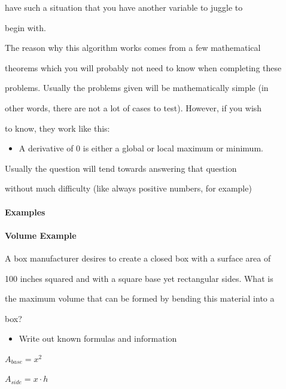     have such a situation that you have another variable to juggle to

    begin with.



The reason why this algorithm works comes from a few mathematical

theorems which you will probably not need to know when completing these

problems. Usually the problems given will be mathematically simple (in

other words, there are not a lot of cases to test). However, if you wish

to know, they work like this:



\begin{itemize}
    \item A derivative of 0 is either a global or local maximum or minimum.
\end{itemize}
    Usually the question will tend towards answering that question

    without much difficulty (like always positive numbers, for example)



\paragraph{Examples}



\paragraph{Volume Example}



A box manufacturer desires to create a closed box with a surface area of

100 inches squared and with a square base yet rectangular sides. What is

the maximum volume that can be formed by bending this material into a

box?



\begin{itemize}
    \item Write out known formulas and information
\end{itemize}

$A_{base}=x^2$



$A_{side}=x\cdot h$



